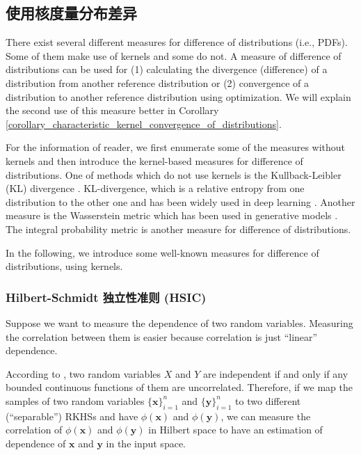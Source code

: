 \documentclass[lang=cn,10pt]{gorgeousnbook}
\numberwithin{equation}{section}%
\numberwithin{figure}{section}%
\begin{document}
\subsection{使用核度量分布差异}

There exist several different measures for difference of distributions (i.e., PDFs). Some of them make use of kernels and some do not. 
A measure of difference of distributions can be used for (1) calculating the divergence (difference) of a distribution from another reference distribution or (2) convergence of a distribution to another reference distribution using optimization. We will explain the second use of this measure better in Corollary \ref{corollary_characteristic_kernel_convergence_of_distributions}.

For the information of reader, we first enumerate some of the measures without kernels and then introduce the kernel-based measures for difference of distributions. 
One of methods which do not use kernels is the Kullback-Leibler (KL) divergence \cite{kullback1951information}. KL-divergence, which is a relative entropy from one distribution to the other one and has been widely used in deep learning \cite{goodfellow2016deep}.
Another measure is the Wasserstein metric which has been used in generative models \cite{arjovsky2017wasserstein}. 
The integral probability metric \cite{muller1997integral} is another measure for difference of distributions. 

In the following, we introduce some well-known measures for difference of distributions, using kernels. 

\subsubsection{Hilbert-Schmidt 独立性准则 (HSIC)}

Suppose we want to measure the dependence of two random variables. Measuring the correlation between them is easier because correlation is just ``linear'' dependence. 

According to \cite{hein2004kernels}, two random variables $X$ and $Y$ are independent if and only if any bounded continuous functions of them are uncorrelated. Therefore, if we map the samples of two random variables $\{\boldsymbol{x}\}_{i=1}^n$ and $\{\boldsymbol{y}\}_{i=1}^n$ to two different (``separable'') RKHSs and have $\phi(\boldsymbol{x})$ and $\phi(\boldsymbol{y})$, we can measure the correlation of $\phi(\boldsymbol{x})$ and $\phi(\boldsymbol{y})$ in Hilbert space to have an estimation of dependence of $\boldsymbol{x}$ and $\boldsymbol{y}$ in the input space. 
\end{document}
